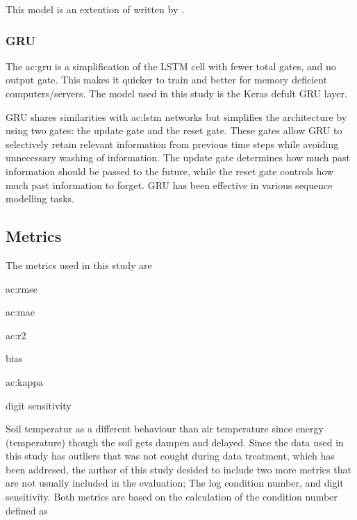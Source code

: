 This model is an extention of \cite{li_modeling_2020} written by \citeauthor{li_modeling_2020}. 

\subsubsection{GRU}

The \acrfull{ac:gru} is a simplification of the LSTM cell with fewer total gates, and no output gate. This makes it quicker to train and better for memory deficient computers/servers. The model used in this study is the Keras defult GRU layer. 

GRU shares similarities with \acrshort{ac:lstm} networks but simplifies the architecture by using two gates: the update gate and the reset gate. These gates allow GRU to selectively retain relevant information from previous time steps while avoiding unnecessary washing of information. The update gate determines how much past information should be passed to the future, while the reset gate controls how much past information to forget. GRU has been effective in various sequence modelling tasks.


\subsection{Metrics}\label{sec:method:metric}

The metrics used in this study are

\begin{itemize*}
	\item \acrfull{ac:rmse}
	\item \acrfull{ac:mae}
	\item \acrfull{ac:r2}
	\item bias
	\item \acrfull{ac:kappa}
	\item digit sensitivity
\end{itemize*}

Soil temperatur as a different behaviour than air temperature since energy (temperature) though the soil gets dampen and delayed. Since the data used in this study has outliers that was not cought during data treatment, which has been addresed, the author of this study desided to include two more metrics that are not usually included in the evaluation; The log condition number, and digit sensitivity. Both metrics are based on the calculation of the condition number defined as 

